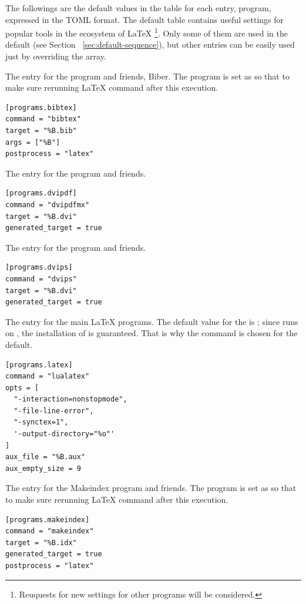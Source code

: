 \documentclass{llmk-doc}
\begin{document}
The followings are the default values in the  table for each
entry, \ie program, expressed in the TOML format. The default 
table contains useful settings for popular tools in the ecosystem of {\LaTeX}%
\footnote{Reuquests for new settings for other programs will be considered.}.
Only some of them are used in the default  (see Section~%
\ref{sec:default-sequence}), but other entries can be easily used just by
overriding the  array.

 The entry for the {\BibTeX} program and friends, \eg Biber.
The  program is set as  so that to make sure
rerunning {\LaTeX} command after this execution.
%
\begin{lstlisting}[style=toml]
[programs.bibtex]
command = "bibtex"
target = "%B.bib"
args = ["%B"]
postprocess = "latex"
\end{lstlisting}

 The entry for the  program and friends.
%
\begin{lstlisting}[style=toml]
[programs.dvipdf]
command = "dvipdfmx"
target = "%B.dvi"
generated_target = true
\end{lstlisting}

 The entry for the  program and friends.
%
\begin{lstlisting}[style=toml]
[programs.dvips]
command = "dvips"
target = "%B.dvi"
generated_target = true
\end{lstlisting}

 The entry for the main {\LaTeX} programs. The default value for
the  is ; since  runs on
, the installation of {\LuaTeX} is guaranteed. That is why the
command is chosen for the default.
%
\begin{lstlisting}[style=toml]
[programs.latex]
command = "lualatex"
opts = [
  "-interaction=nonstopmode",
  "-file-line-error",
  "-synctex=1",
  '-output-directory="%o"'
]
aux_file = "%B.aux"
aux_empty_size = 9
\end{lstlisting}

 The entry for the Makeindex program and friends. The
 program is set as  so that to make sure
rerunning {\LaTeX} command after this execution.
%
\begin{lstlisting}[style=toml]
[programs.makeindex]
command = "makeindex"
target = "%B.idx"
generated_target = true
postprocess = "latex"
\end{lstlisting}
\end{document}
